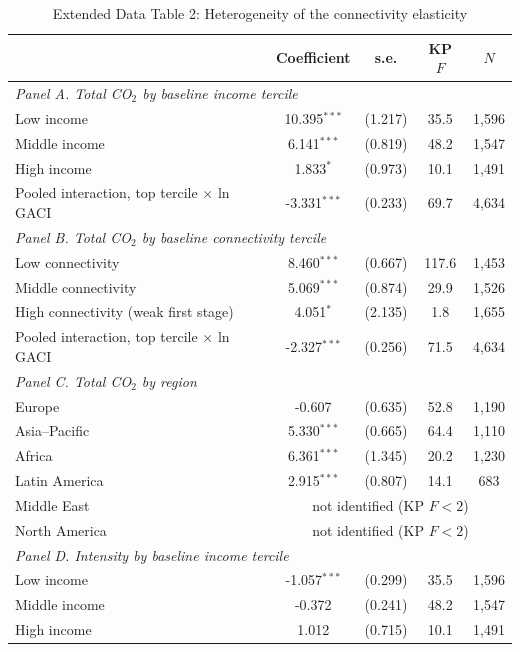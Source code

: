 \documentclass[12pt]{article}
\begin{document}
\begin{table}[htbp]
\centering
\begin{threeparttable}
\caption{Extended Data Table 2: Heterogeneity of the connectivity elasticity}
\label{tab:hetero}
\footnotesize
\begin{tabular}{lcccc}
\toprule
 & Coefficient & s.e. & KP $F$ & $N$ \\
\midrule
\multicolumn{5}{l}{\textit{Panel A. Total CO$_2$ by baseline income tercile}} \\
  Low income & 10.395$^{***}$ & (1.217) & 35.5 & 1,596 \\
  Middle income & 6.141$^{***}$ & (0.819) & 48.2 & 1,547 \\
  High income & 1.833$^{*}$ & (0.973) & 10.1 & 1,491 \\
  \quad Pooled interaction, top tercile $\times$ ln GACI & -3.331$^{***}$ & (0.233) & 69.7 & 4,634 \\
\midrule
\multicolumn{5}{l}{\textit{Panel B. Total CO$_2$ by baseline connectivity tercile}} \\
  Low connectivity & 8.460$^{***}$ & (0.667) & 117.6 & 1,453 \\
  Middle connectivity & 5.069$^{***}$ & (0.874) & 29.9 & 1,526 \\
  High connectivity (weak first stage) & 4.051$^{*}$ & (2.135) & 1.8 & 1,655 \\
  \quad Pooled interaction, top tercile $\times$ ln GACI & -2.327$^{***}$ & (0.256) & 71.5 & 4,634 \\
\midrule
\multicolumn{5}{l}{\textit{Panel C. Total CO$_2$ by region}} \\
  Europe & -0.607 & (0.635) & 52.8 & 1,190 \\
  Asia--Pacific & 5.330$^{***}$ & (0.665) & 64.4 & 1,110 \\
  Africa & 6.361$^{***}$ & (1.345) & 20.2 & 1,230 \\
  Latin America & 2.915$^{***}$ & (0.807) & 14.1 & 683 \\
  Middle East & \multicolumn{4}{c}{not identified (KP $F<2$)} \\
  North America & \multicolumn{4}{c}{not identified (KP $F<2$)} \\
\midrule
\multicolumn{5}{l}{\textit{Panel D. Intensity by baseline income tercile}} \\
  Low income & -1.057$^{***}$ & (0.299) & 35.5 & 1,596 \\
  Middle income & -0.372 & (0.241) & 48.2 & 1,547 \\
  High income & 1.012 & (0.715) & 10.1 & 1,491 \\

\end{tabular}
\end{threeparttable}
\end{table}
\end{document}
